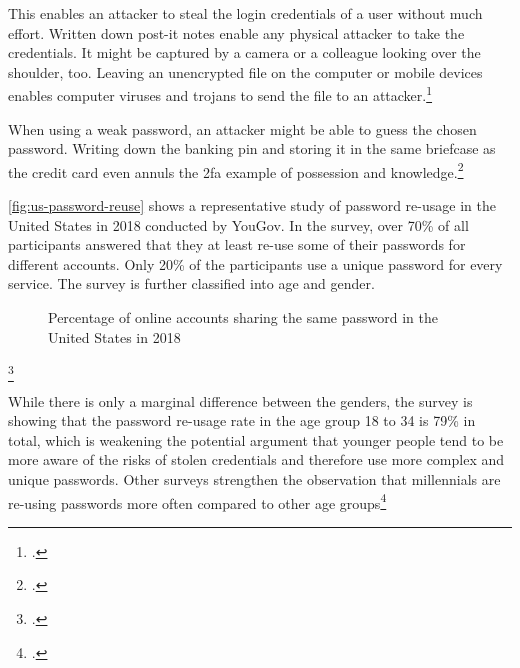 This enables an attacker to steal the login credentials of a user without much effort. Written down post-it notes enable any physical attacker to take the credentials. It might be captured by a camera or a colleague looking over the shoulder, too. Leaving an unencrypted file on the computer or mobile devices  enables computer viruses and trojans to send the file to an attacker.\footcites[See][Chapter 4.1]{kissell2019take}

When using a weak password, an attacker might be able to guess the chosen password. Writing down the banking \gls{pin} and storing it in the same briefcase as the credit card even annuls the \gls{2fa} example of possession and knowledge.\footcites[See][xxi]{swenson2012modern}

\autoref{fig:us-password-reuse} shows a representative study of password re-usage in the United States in 2018 conducted by YouGov. In the survey, over 70\% of all participants answered that they at least re-use some of their passwords for different accounts. Only 20\% of the participants use a unique password for every service. The survey is further classified into age and gender. 

\begin{figure}[h]
	\begin{bchart}[min=5, max=55, step=10, unit=\%, scale=1.2]
		\medskip
		\medskip
		\bigskip
		\bigskip
	\end{bchart}
	\caption[Percentage of online accounts sharing the same password in the United States in 2018]{Percentage of online accounts sharing the same password in the United States in 2018\footnotemark}
	\label{fig:us-password-reuse}
\end{figure}
\footcitetext[Source:][8]{yougov}

While there is only a marginal difference between the genders, the survey is showing that the password re-usage rate in the age group 18 to 34 is 79\% in total, which is weakening the potential argument that younger people tend to be more aware of the risks of stolen credentials and therefore use more complex and unique passwords. Other surveys strengthen the observation that millennials are re-using passwords more often compared to other age groups\footcites[See][10]{ibm-security}[See][8]{yougov}[See][11]{lastpass}[See][1429]{Thomas:2017:DBP:3133956.3134067}

